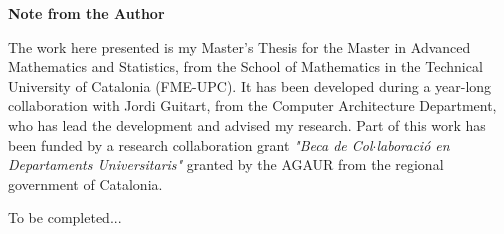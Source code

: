 \vspace*{4cm}
\Huge
\textbf{Note from the Author} \label{sec:acknowledgments}
\normalsize

\vspace{1cm}

The work here presented is my Master's Thesis for the Master in Advanced Mathematics and Statistics, from the School of Mathematics in the Technical University of Catalonia (FME-UPC).
It has been developed during a year-long collaboration with Jordi Guitart, from the Computer Architecture Department, who has lead the development and advised my research.
Part of this work has been funded by a research collaboration grant \textit{"Beca de Col$\cdot$laboraci\'o en Departaments Universitaris"} granted by the AGAUR from the regional government of Catalonia.

To be completed...

%
%

\vspace*{\fill}
